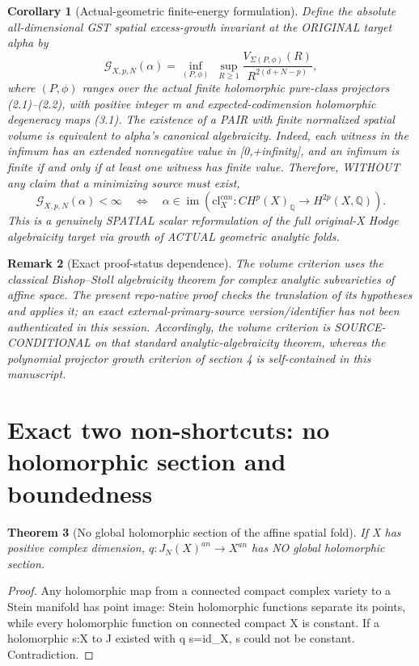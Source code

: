 \documentclass[11pt]{article}
\newtheorem{theorem}{Theorem}[section]
\newtheorem{corollary}[theorem]{Corollary}
\newtheorem{remark}[theorem]{Remark}
\begin{document}
\begin{corollary}[Actual-geometric finite-energy formulation]
Define the absolute all-dimensional
GST spatial excess-growth invariant
at the ORIGINAL target alpha by
\[
 \boxed{
 \mathcal G_{X,p,N}(\alpha)
 =\inf_{(P,\phi)}\;
    \sup_{R\ge1}\frac{
     V_{\Sigma(P,\phi)}(R)}{R^{2(d+N-p)}},
 }                                                        \tag{5.4}
\]
where $(P,\phi)$ ranges over the actual
finite holomorphic pure-class projectors
(2.1)--(2.2), with positive integer m
and expected-codimension holomorphic
degeneracy maps (3.1).
The existence of a PAIR with finite
normalized spatial volume is equivalent
to alpha's canonical algebraicity. Indeed,
each witness in the infimum has an
extended nonnegative value in [0,+infinity],
and an infimum is finite if and only if
at least one witness has finite value.
Therefore, WITHOUT any claim that
a minimizing source must exist,
\[
 \boxed{
 \mathcal G_{X,p,N}(\alpha)<\infty
 \quad\Longleftrightarrow\quad
 \alpha\in\operatorname{im}
   (\mathrm{cl}^{can}_X:CH^p(X)_{\mathbb Q}
     \longrightarrow H^{2p}(X,\mathbb Q)).
 }                                                        \tag{5.5}
\]
This is a genuinely SPATIAL scalar
reformulation of the full original-X
Hodge algebraicity target via growth
of ACTUAL geometric analytic folds.
\end{corollary}
\begin{remark}[Exact proof-status dependence]
The volume criterion uses the
classical Bishop--Stoll algebraicity
theorem for complex analytic
subvarieties of affine space.
The present repo-native proof
checks the translation of its
hypotheses and applies it;
an exact external-primary-source
version/identifier has not been
authenticated in this session.
Accordingly, the volume criterion
is SOURCE-CONDITIONAL on that
standard analytic-algebraicity
theorem, whereas the polynomial
projector growth criterion of
section 4 is self-contained in
this manuscript.
\end{remark}

\section{Exact two non-shortcuts: no holomorphic section and boundedness}
\begin{theorem}[No global holomorphic section of the affine spatial fold]
If X has positive complex dimension,
$q:J_N(X)^{an}\to X^{an}$ has NO
global holomorphic section.
\end{theorem}
\begin{proof}
Any holomorphic map from a connected
compact complex variety to a Stein
manifold has point image: Stein
holomorphic functions separate its
points, while every holomorphic
function on connected compact X
is constant. If a holomorphic s:X
to J existed with q s=id_X,
s could not be constant. Contradiction.
\end{proof}
\end{document}
